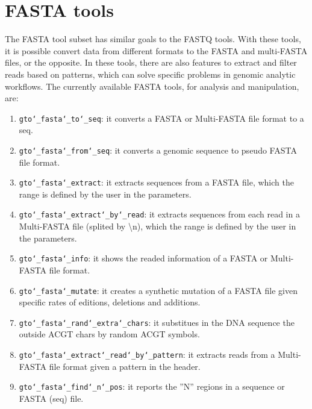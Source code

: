 \chapter{FASTA tools}
\label{fasta}
The FASTA tool subset has similar goals to the FASTQ tools. With these tools, it is possible convert data from different formats to the FASTA and multi-FASTA files, or the opposite. In these tools, there are also features to extract and filter reads based on patterns, which can solve specific problems in genomic analytic workflows. The currently available FASTA tools, for analysis and manipulation, are:
\begin{enumerate}

\item \texttt{gto\char`_fasta\char`_to\char`_seq}: it converts a FASTA or Multi-FASTA file format to a seq.

\item \texttt{gto\char`_fasta\char`_from\char`_seq}: it converts a genomic sequence to pseudo FASTA file format.

\item \texttt{gto\char`_fasta\char`_extract}: it extracts sequences from a FASTA file, which the range is defined by the user in the parameters.

\item \texttt{gto\char`_fasta\char`_extract\char`_by\char`_read}: it extracts sequences from each read in a Multi-FASTA file (splited by \textbackslash n), which the range is defined by the user in the parameters.

\item \texttt{gto\char`_fasta\char`_info}: it shows the readed information of a FASTA or Multi-FASTA file format.

\item \texttt{gto\char`_fasta\char`_mutate}: it creates a synthetic mutation of a FASTA file given specific rates of editions, deletions and additions.

\item \texttt{gto\char`_fasta\char`_rand\char`_extra\char`_chars}: it substitues in the DNA sequence the outside ACGT chars by random ACGT symbols.

\item \texttt{gto\char`_fasta\char`_extract\char`_read\char`_by\char`_pattern}: it extracts reads from a Multi-FASTA file format given a pattern in the header.

\item \texttt{gto\char`_fasta\char`_find\char`_n\char`_pos}: it reports the ''N'' regions in a sequence or FASTA (seq) file.


\end{enumerate}
